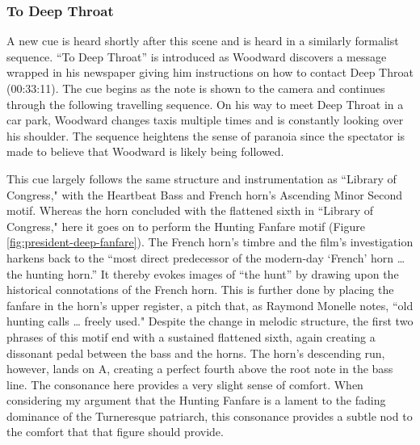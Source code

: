 \subsubsection{To Deep Throat}

A new cue is heard shortly after this scene and is heard in a similarly formalist sequence.
``To Deep Throat” is introduced as Woodward discovers a message wrapped in his newspaper giving him instructions on how to contact Deep Throat
(00:33:11).
The cue begins as the note is shown to the camera and continues through the following travelling sequence.
On his way to meet Deep Throat in a car park, Woodward changes taxis multiple times and is constantly looking over his shoulder.
The sequence heightens the sense of paranoia since the spectator is made to believe that Woodward is likely being followed.

This cue largely follows the same structure and instrumentation as ``Library of Congress," with the Heartbeat Bass and French horn's Ascending Minor Second motif.
Whereas the horn concluded with the flattened sixth in ``Library of Congress," here it goes on to perform the Hunting Fanfare motif (Figure \ref{fig:president-deep-fanfare}).
The French horn's timbre and the film's investigation harkens back to the ``most direct predecessor of the modern-day `French’ horn … the hunting horn.”\autocites[][22]{mckinney_forest_2020}
It thereby evokes images of ``the hunt” by drawing upon the historical connotations of the French horn.
This is further done by placing the fanfare in the horn’s upper register, a pitch that, as Raymond Monelle notes, ``old hunting calls … freely used."\autocites[][102]{monelle_horn_2001}
Despite the change in melodic structure, the first two phrases of this motif end with a sustained flattened sixth, again creating a dissonant pedal between the bass and the horns.
The horn's descending run, however, lands on A\flat, creating a perfect fourth above the root note in the bass line.
The consonance here provides a very slight sense of comfort.
When considering my argument that the Hunting Fanfare is a lament to the fading dominance of the Turneresque patriarch, this consonance provides a subtle nod to the comfort that that figure should provide.


